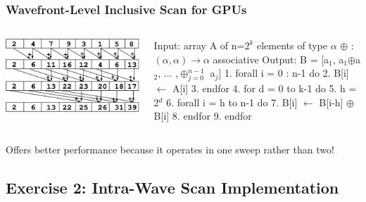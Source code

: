 \documentclass{beamer}
\newcommand{\emp}[1]{\textcolor{DikuRed}{ #1}}
\newcommand{\mymath}[1]{$ #1 $}
\newcommand{\myindx}[1]{_{#1}}
\newcommand{\myindu}[1]{^{#1}}
\begin{document}
\begin{frame}[fragile,t]
  \frametitle{Wavefront-Level Inclusive Scan for GPUs}

\begin{columns}
\includegraphics[height=15ex]{img/day3/incScanGPU} 
\begin{colorcode}
Input:  array A of n=\mymath{2\myindu{k}} elements
                       of type \mymath{\alpha}
        \mymath{\oplus} : \mymath{(\alpha,\alpha)\to\alpha} associative
Output: B = [a\mymath{\myindx{1}}, a\mymath{\myindx{1}}\mymath{\oplus}a\mymath{\myindx{2}}, \mymath{\ldots} ,\mymath{\oplus\myindx{j=0}\myindu{n-1}} a\mymath{\myindx{j}}]
1.  forall i = 0 : n-1 do
2.    B[i] \mymath{\leftarrow} A[i]
3.  endfor
4.  for d = 0 to k-1 do
5.    h = 2\mymath{\myindu{d}}
6.    forall i = h to n-1 do 
7.      B[i] \mymath{\leftarrow} B[i-h] \mymath{\oplus} B[i]
8.    endfor
9.  endfor
\end{colorcode}
\end{columns}\bigskip

\emp{Offers better performance because it operates in one sweep rather than two!}

\end{frame}

\subsection{Exercise 2: Intra-Wave Scan Implementation}
\end{document}
